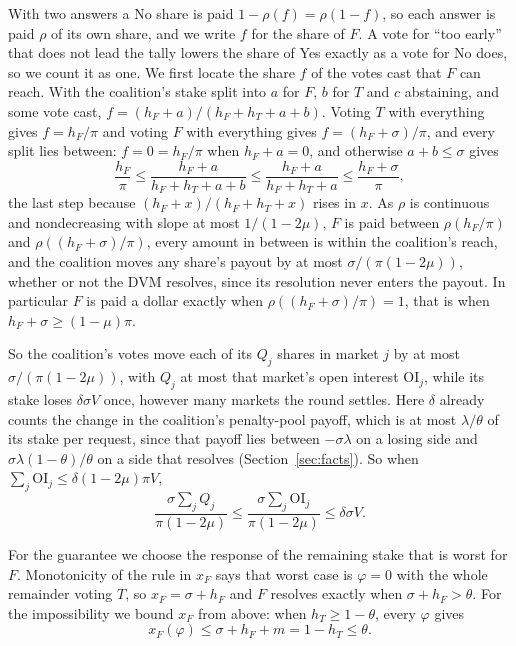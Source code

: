 \documentclass[conference,compsoc]{IEEEtran}
\newcommand{\muparam}{\mu}
\newcommand{\hF}{h_{F}}
\newcommand{\hT}{h_{T}}
\begin{document}
\begin{IEEEproof}
 With two answers a No share is paid $1 - \rho(f) = \rho(1 - f)$, so each answer is paid $\rho$ of its own share, and we write $f$ for the share of $F$. A vote for ``too early'' that does not lead the tally lowers the share of Yes exactly as a vote for No does, so we count it as one. We first locate the share $f$ of the votes cast that $F$ can reach. With the coalition's stake split into $a$ for $F$, $b$ for $T$ and $c$ abstaining, and some vote cast, $f = (\hF + a)/(\hF + \hT + a + b)$. Voting $T$ with everything gives $f = \hF/\pi$ and voting $F$ with everything gives $f = (\hF + \sigma)/\pi$, and every split lies between: $f = 0 = \hF/\pi$ when $\hF + a = 0$, and otherwise $a + b \le \sigma$ gives
\[
\frac{\hF}{\pi} \le \frac{\hF + a}{\hF + \hT + a + b} \le \frac{\hF + a}{\hF + \hT + a} \le \frac{\hF + \sigma}{\pi},
\]
 the last step because $(\hF + x)/(\hF + \hT + x)$ rises in $x$. As $\rho$ is continuous and nondecreasing with slope at most $1/(1 - 2\muparam)$, $F$ is paid between $\rho(\hF/\pi)$ and $\rho((\hF + \sigma)/\pi)$, every amount in between is within the coalition's reach, and the coalition moves any share's payout by at most $\sigma/(\pi(1 - 2\muparam))$, whether or not the DVM resolves, since its resolution never enters the payout. In particular $F$ is paid a dollar exactly when $\rho((\hF + \sigma)/\pi) = 1$, that is when $\hF + \sigma \ge (1 - \muparam)\pi$.

 So the coalition's votes move each of its $Q_j$ shares in market $j$ by at most $\sigma/(\pi(1 - 2\muparam))$, with $Q_j$ at most that market's open interest $\mathrm{OI}_j$, while its stake loses $\delta\sigma V$ once, however many markets the round settles. Here $\delta$ already counts the change in the coalition's penalty-pool payoff, which is at most $\lambda/\theta$ of its stake per request, since that payoff lies between $-\sigma\lambda$ on a losing side and $\sigma\lambda(1-\theta)/\theta$ on a side that resolves (Section~\ref{sec:facts}). So when $\sum_j \mathrm{OI}_j \le \delta(1 - 2\muparam)\pi V$,
\[
\frac{\sigma\sum_j Q_j}{\pi(1-2\muparam)} \le \frac{\sigma\sum_j \mathrm{OI}_j}{\pi(1-2\muparam)} \le \delta\sigma V .
\]
\end{IEEEproof}

\begin{IEEEproof}
 For the guarantee we choose the response of the remaining stake that is worst for $F$. Monotonicity of the rule in $x_F$ says that worst case is $\varphi = 0$ with the whole remainder voting $T$, so $x_F = \sigma + \hF$ and $F$ resolves exactly when $\sigma + \hF > \theta$. For the impossibility we bound $x_F$ from above: when $\hT \ge 1 - \theta$, every $\varphi$ gives
\[
x_F(\varphi) \le \sigma + \hF + m = 1 - \hT \le \theta .
\]
\end{IEEEproof}
\end{document}
